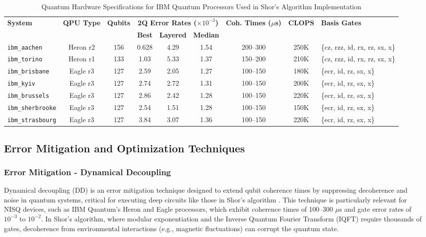 \documentclass[conference,twoside]{IEEEtran}
\begin{document}
\begin{table}[h]
\centering
\caption{Quantum Hardware Specifications for IBM Quantum Processors Used in Shor's Algorithm Implementation}
\label{tab:hardware_specs}
\begin{tabular}{lccccccc l}
\toprule
\textbf{System} & \textbf{QPU Type} & \textbf{Qubits} & \multicolumn{3}{c}{\textbf{2Q Error Rates (\( \times 10^{-3} \))}} & \textbf{Coh. Times (\( \mu \)s)} & \textbf{CLOPS} & \textbf{Basis Gates }\\
\cmidrule(lr){4-6}
 & & & \textbf{Best} & \textbf{Layered} & \textbf{Median} & & & \\
\midrule
\texttt{ibm\_aachen} & Heron r2 & 156 & 0.628 & 4.29 & 1.54 & 200--300 & 250K & \{cz, rzz, id, rx, rz, sx, x\} \\
\texttt{ibm\_torino} & Heron r1 & 133 & 1.03 & 5.33 & 1.37 & 150--200 & 210K & \{cz, rzz, id, rx, rz, sx, x\} \\
\texttt{ibm\_brisbane} & Eagle r3 & 127 & 2.59 & 2.05 & 1.27 & 100--150 & 180K & \{ecr, id, rz, sx, x\} \\
\texttt{ibm\_kyiv} & Eagle r3 & 127 & 2.74 & 2.72 & 1.31 & 100--150 & 200K & \{ecr, id, rz, sx, x\} \\
\texttt{ibm\_brussels} & Eagle r3 & 127 & 2.86 & 2.42 & 1.28 & 100--150 & 220K & \{ecr, id, rz, sx, x\} \\
\texttt{ibm\_sherbrooke} & Eagle r3 & 127 & 2.54 & 1.51 & 1.28 & 100--150 & 150K & \{ecr, id, rz, sx, x\} \\
\texttt{ibm\_strasbourg} & Eagle r3 & 127 & 3.84 & 3.07 & 1.36 & 100--150 & 220K & \{ecr, id, rz, sx, x\} \\
\bottomrule
\end{tabular}
\end{table}



\subsection{Error Mitigation and Optimization Techniques}
\subsubsection{Error Mitigation - Dynamical Decoupling}
Dynamical decoupling (DD) is an error mitigation technique designed to extend qubit coherence times by suppressing decoherence and noise in quantum systems, critical for executing deep circuits like those in Shor's algorithm\citep*{vitali2007} \citep*{tong2025}. This technique is particularly relevant for NISQ devices, such as IBM Quantum's Heron and Eagle processors, which exhibit coherence times of 100–300 \(\mu\)s and gate error rates of \(10^{-3}\) to \(10^{-2}\). In Shor's algorithm, where modular exponentiation and the Inverse Quantum Fourier Transform (IQFT) require thousands of gates, decoherence from environmental interactions (e.g., magnetic fluctuations) can corrupt the quantum state.
\end{document}
